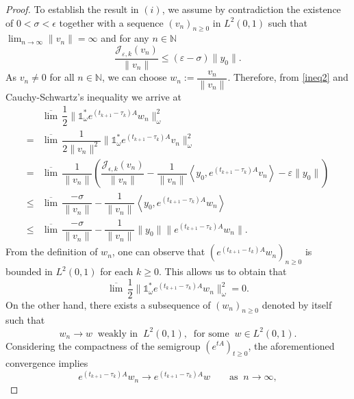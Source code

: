 \documentclass[sn-mathphys]{sn-jnl}
\begin{document}
\begin{proof}
    To establish the result in $(i)$, we assume by contradiction the existence of \(0<\sigma <\epsilon\) together with a sequence \((v_n)_{n \geq 0}\) in $L^2(0,1)$ such that \(\displaystyle{\lim_{n \to \infty}} \| v_n\| = \infty\) and for any $n \in \mathbb{N}$
    \begin{equation}\label{ineq2}
        \dfrac{\mathcal{J}_{\varepsilon,k}(v_n)}{\|v_n\|} \leq (\varepsilon-\sigma)\|y_0\|.
    \end{equation}
    As $v_n \neq 0$ for all $n \in \mathbb{N}$, we can choose $w_n := \dfrac{v_n}{\|v_n\|}$. Therefore, from \eqref{ineq2} and Cauchy-Schwartz's inequality we arrive at
    \begin{align}\label{ineq3}
        &\overline{\lim} \,\dfrac{1}{2} \|\mathds{1}_{\omega}^{*} e^{(t_{k+1}-\tau_k)A} w_n \|^2_{\omega}\nonumber\\
        = &\overline{\lim} \,\dfrac{1}{2\|v_n\|^2} \|\mathds{1}_{\omega}^{*} e^{(t_{k+1}-\tau_k)A} v_n \|^2_{\omega}\nonumber\\
        = &\overline{\lim} \,\dfrac{1}{\|v_n\|} \left( \dfrac{\mathcal{J}_{\epsilon,k}(v_n)}{\|v_n\|} - \dfrac{1}{\|v_n\|} \left\langle y_0, e^{(t_{k+1}-\tau_k)A} v_n \right\rangle - \varepsilon\|y_0\| \right)\nonumber\\
        \leq &\overline{\lim} \,\dfrac{-\sigma}{\|v_n\|} -\dfrac{1}{\|v_n\|} \left\langle y_0, e^{(t_{k+1}-\tau_k)A} w_n \right\rangle\nonumber\\
        \leq &\overline{\lim} \,\dfrac{-\sigma}{\|v_n\|} - \dfrac{1}{\|v_n\|} \|y_0\| \|e^{(t_{k+1}-\tau_k)A} w_n\|.
    \end{align}
    From the definition of $w_n$, one can observe that \((e^{(t_{k+1}-t_k)A} w_n)_{n \geq 0}\) is bounded in $L^2(0,1)$ for each $k \geq 0$. This allows us to obtain that
    \begin{equation}\label{conveerg1}
        \overline{\lim} \,\dfrac{1}{2} \|\mathds{1}_{\omega}^{*} e^{(t_{k+1}-\tau_k)A} w_n \|^2_{\omega} = 0.
    \end{equation}
    On the other hand, there exists a subsequence of \((w_n)_{n \geq 0}\) denoted by itself such that
    \[w_n \to w \;\;\text{weakly in}\;\; L^2(0,1), \;\;\text{for some}\;\; w \in L^2(0,1).\]
    Considering the compactness of the semigroup \((e^{tA})_{t \geq 0}\), the aforementioned convergence implies
    \begin{equation}\label{converg2}
        e^{(t_{k+1}-\tau_k)A} w_n \to e^{(t_{k+1}-\tau_k)A} w \qquad \text{as}\;\; n \to \infty,

\end{equation}
\end{proof}
\end{document}
